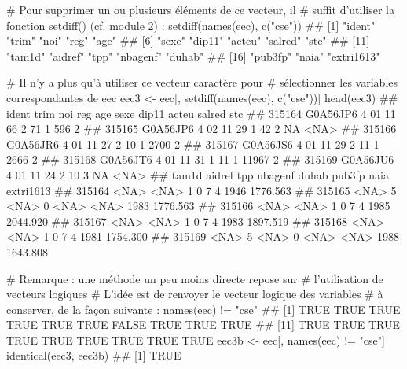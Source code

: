 \documentclass[12pt,twosided, notitlepage]{book}
\newenvironment{Shaded}{}{}
\newcommand{\KeywordTok}[1]{\textcolor[rgb]{0.00,0.00,1.00}{{#1}}}
\newcommand{\StringTok}[1]{\textcolor[rgb]{0.00,0.50,0.50}{{#1}}}
\newcommand{\CommentTok}[1]{\textcolor[rgb]{0.00,0.50,0.00}{{#1}}}
\newcommand{\NormalTok}[1]{{#1}}
\renewenvironment{Shaded}{\begin{snugshade}}{\end{snugshade}}
\begin{document}
\begin{enumerate}
\begin{enumerate}
\begin{Shaded}
\begin{Highlighting}[]
\CommentTok{# Pour supprimer un ou plusieurs éléments de ce vecteur, il }
\CommentTok{# suffit d'utiliser la fonction setdiff() (cf. module 2) : }
\KeywordTok{setdiff}\NormalTok{(}\KeywordTok{names}\NormalTok{(eec), }\KeywordTok{c}\NormalTok{(}\StringTok{"cse"}\NormalTok{))}
  \NormalTok{##  [1] "ident"     "trim"      "noi"       "reg"       "age"      }
  \NormalTok{##  [6] "sexe"      "dip11"     "acteu"     "salred"    "stc"      }
  \NormalTok{## [11] "tam1d"     "aidref"    "tpp"       "nbagenf"   "duhab"    }
  \NormalTok{## [16] "pub3fp"    "naia"      "extri1613"}

\CommentTok{# Il n'y a plus qu'à utiliser ce vecteur caractère pour }
\CommentTok{# sélectionner les variables correspondantes de eec}
\NormalTok{eec3 <-}\StringTok{ }\NormalTok{eec[, }\KeywordTok{setdiff}\NormalTok{(}\KeywordTok{names}\NormalTok{(eec), }\KeywordTok{c}\NormalTok{(}\StringTok{"cse"}\NormalTok{))]}
\KeywordTok{head}\NormalTok{(eec3)}
  \NormalTok{##           ident trim noi reg age sexe dip11 acteu salred  stc}
  \NormalTok{## 315164 G0A56JP6    4  01  11  66    2    71     1    596    2}
  \NormalTok{## 315165 G0A56JP6    4  02  11  29    1    42     2     NA <NA>}
  \NormalTok{## 315166 G0A56JR6    4  01  11  27    2    10     1   2700    2}
  \NormalTok{## 315167 G0A56JS6    4  01  11  29    2    11     1   2666    2}
  \NormalTok{## 315168 G0A56JT6    4  01  11  31    1    11     1  11967    2}
  \NormalTok{## 315169 G0A56JU6    4  01  11  24    2    10     3     NA <NA>}
  \NormalTok{##        tam1d aidref  tpp nbagenf duhab pub3fp naia extri1613}
  \NormalTok{## 315164  <NA>   <NA>    1       0     7      4 1946  1776.563}
  \NormalTok{## 315165  <NA>      5 <NA>       0  <NA>   <NA> 1983  1776.563}
  \NormalTok{## 315166  <NA>   <NA>    1       0     7      4 1985  2044.920}
  \NormalTok{## 315167  <NA>   <NA>    1       0     7      4 1983  1897.519}
  \NormalTok{## 315168  <NA>   <NA>    1       0     7      4 1981  1754.300}
  \NormalTok{## 315169  <NA>      5 <NA>       0  <NA>   <NA> 1988  1643.808}

\CommentTok{# Remarque : une méthode un peu moins directe repose sur }
\CommentTok{# l'utilisation de vecteurs logiques }
\CommentTok{# L'idée est de renvoyer le vecteur logique des variables}
\CommentTok{# à conserver, de la façon suivante : }
\KeywordTok{names}\NormalTok{(eec) !=}\StringTok{ "cse"}
  \NormalTok{##  [1]  TRUE  TRUE  TRUE  TRUE  TRUE  TRUE FALSE  TRUE  TRUE  TRUE}
  \NormalTok{## [11]  TRUE  TRUE  TRUE  TRUE  TRUE  TRUE  TRUE  TRUE  TRUE}
\NormalTok{eec3b <-}\StringTok{ }\NormalTok{eec[, }\KeywordTok{names}\NormalTok{(eec) !=}\StringTok{ "cse"}\NormalTok{]}
\KeywordTok{identical}\NormalTok{(eec3, eec3b)}
  \NormalTok{## [1] TRUE}


\end{Highlighting}
\end{Shaded}
\end{enumerate}
\end{enumerate}
\end{document}

